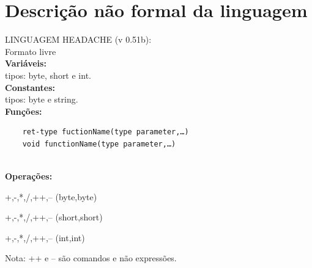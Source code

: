 %
%
% 
%
\chapter{Descrição não formal da linguagem}
\noindent

LINGUAGEM HEADACHE (v 0.51b):\\
Formato livre \\
\textbf{Variáveis:} \\
tipos: byte, short e int. \\
\textbf{Constantes:}\\
tipos: byte e string.\\
\textbf{Funções:} 
\begin{verbatim}
    ret-type fuctionName(type parameter,…)
    void functionName(type parameter,…)
\end{verbatim} \\
\textbf{Operações:}

+,-,*,/,++,--  (byte,byte)

+,-,*,/,++,--  (short,short)

+,-,*,/,++,--  (int,int)

Nota: ++ e -- são comandos e não expressões.

